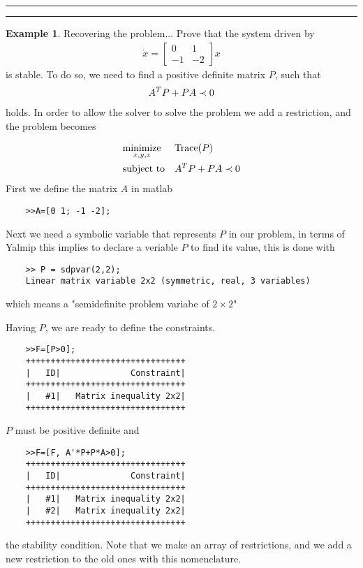 \documentclass[nols]{tufte-handout}
\theoremstyle{definition}
\newtheorem{exmp}{Example}[section]
\begin{document}
\vspace{0.5cm} 
\hrule
\hrule
\begin{exmp}\label{ex:yalmip}
    Recovering the problem...
    Prove that the system driven by
    \begin{align}
    \dot x=
    \begin{bmatrix}
        0 & 1\\
        -1 & -2
    \end{bmatrix}x
\end{align}
is stable. To do so, we need to find a positive definite matrix $P$, such that
\begin{align}\label{lyap1}
    A^TP+PA\prec 0
\end{align}
holds.
In order to allow the solver to solve the problem we add a restriction, and the problem becomes

\begin{align}\label{eq:extended}
    & \underset{x,y,z}{\text{minimize}}& & \text{Trace}(P) \\
    & \text{subject to}            & & A^TP+PA\prec 0\nonumber
\end{align}
First we define the matrix $A$ in matlab
\begin{verbatim}
    >>A=[0 1; -1 -2];
\end{verbatim}
Next we need a symbolic variable that represents $P$ in our problem, in terms of Yalmip this implies to declare a veriable $P$ to find its value, this is done with
\begin{verbatim}
    >> P = sdpvar(2,2);
    Linear matrix variable 2x2 (symmetric, real, 3 variables)
\end{verbatim}
which means a "semidefinite problem variabe of $2 \times 2$"

Having $P$, we are ready to define the constraints.

\begin{verbatim}
    >>F=[P>0];
    ++++++++++++++++++++++++++++++++
    |   ID|              Constraint|
    ++++++++++++++++++++++++++++++++
    |   #1|   Matrix inequality 2x2|
    ++++++++++++++++++++++++++++++++
\end{verbatim}
$P$ must be positive definite and

\begin{verbatim}
    >>F=[F, A'*P+P*A>0];
    ++++++++++++++++++++++++++++++++
    |   ID|              Constraint|
    ++++++++++++++++++++++++++++++++
    |   #1|   Matrix inequality 2x2|
    |   #2|   Matrix inequality 2x2|
    ++++++++++++++++++++++++++++++++
\end{verbatim}
the stability condition. Note that we make an array of restrictions, and we add a new restriction to the old ones with this nomenclature.


\end{exmp}
\end{document}
